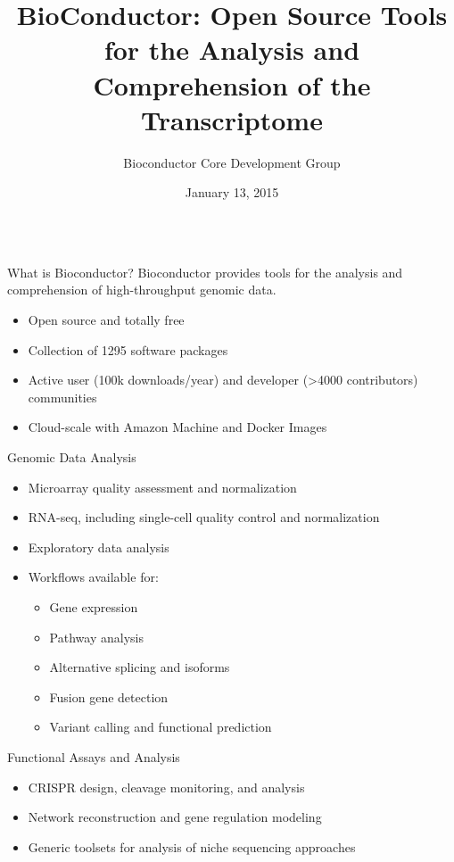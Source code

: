 \documentclass[final]{beamer}
\title{BioConductor:  Open Source Tools for the Analysis and Comprehension of the Transcriptome}
\author{Bioconductor Core Development Group}
\date{January 13, 2015}
\begin{document}
\begin{frame}[t]
  \begin{columns}[t]
    \begin{column}{0.24\linewidth}
      \begin{block}{What is Bioconductor?}
        Bioconductor provides tools for the analysis and comprehension of high-throughput genomic data.
        \begin{itemize}
        \item{Open source and totally free}
        \item{Collection of 1295 software packages}
        \item{Active user (100k downloads/year) and developer (>4000 contributors) communities}
        \item{Cloud-scale with Amazon Machine and Docker Images}
        \end{itemize}
      \end{block}
      \begin{block}{Genomic Data Analysis}
        \begin{itemize}
        \item{Microarray quality assessment and normalization}
        \item{RNA-seq, including single-cell quality control and normalization}
        \item{Exploratory data analysis}
        \item{Workflows available for:}
     \begin{itemize}
       \item{Gene expression}
       \item{Pathway analysis}
       \item{Alternative splicing and isoforms}
       \item{Fusion gene detection}
       \item{Variant calling and functional prediction}
     \end{itemize}
        \end{itemize}
      \end{block}
      \begin{block}{Functional Assays and Analysis}
        \begin{itemize}
        \item{CRISPR design, cleavage monitoring, and analysis}
        \item{Network reconstruction and gene regulation modeling}
        \item{Generic toolsets for analysis of niche sequencing approaches}

\end{itemize}
\end{block}
\end{column}
\end{columns}
\end{frame}
\end{document}
